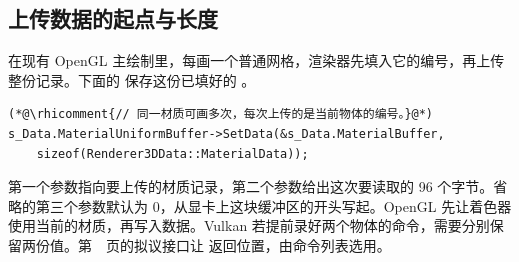 \subsection{上传数据的起点与长度}
在现有 OpenGL 主绘制里，每画一个普通网格，渲染器先填入它的编号，再上传整份记录。下面的  保存这份已填好的 。
\begin{lstlisting}
(*@\rhicomment{// 同一材质可画多次，每次上传的是当前物体的编号。}@*)
s_Data.MaterialUniformBuffer->SetData(&s_Data.MaterialBuffer,
    sizeof(Renderer3DData::MaterialData));
\end{lstlisting}

第一个参数指向要上传的材质记录，第二个参数给出这次要读取的 96 个字节。省略的第三个参数默认为 0，从显卡上这块缓冲区的开头写起。OpenGL 先让着色器使用当前的材质，再写入数据。Vulkan 若提前录好两个物体的命令，需要分别保留两份值。第~\pageref{sec:data-frame}~页的拟议接口让  返回位置，由命令列表选用。

